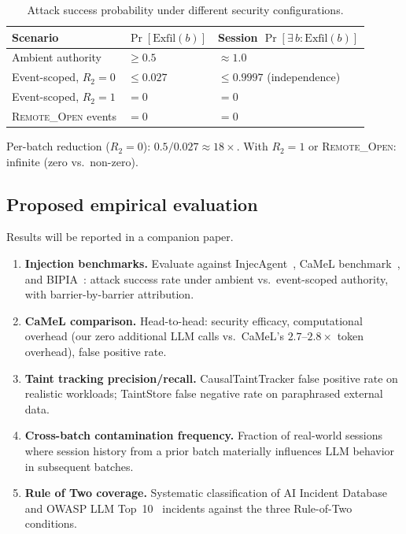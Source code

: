 \documentclass[pdflatex,sn-nature]{sn-jnl}%
\theoremstyle{thmstyleone}%
\theoremstyle{thmstyletwo}%
\theoremstyle{thmstylethree}%
\begin{document}
\begin{table}[ht]
\caption{Attack success probability under different security configurations.}\label{tab:scenario}
\begin{tabular}{@{}lll@{}}
\toprule
Scenario & $\Pr[\text{Exfil}(b)]$ & Session $\Pr[\exists\, b: \text{Exfil}(b)]$ \\
\midrule
Ambient authority & $\geq 0.5$ & $\approx 1.0$ \\[4pt]
Event-scoped, $R_2 = 0$ & $\leq 0.027$ & $\leq 0.9997$ (independence) \\[4pt]
Event-scoped, $R_2 = 1$ & $= 0$ & $= 0$ \\[4pt]
\textsc{Remote\_Open} events & $= 0$ & $= 0$ \\
\bottomrule
\end{tabular}
\end{table}

Per-batch reduction ($R_2=0$): $0.5 / 0.027 \approx 18\times$. With $R_2=1$ or \textsc{Remote\_Open}: infinite (zero vs.\ non-zero).

\subsection{Proposed empirical evaluation}\label{subsec:eval}

Results will be reported in a companion paper.

\begin{enumerate}
  \item \textbf{Injection benchmarks.} Evaluate against InjecAgent~\cite{zhan2024injecagent}, CaMeL benchmark~\cite{debenedetti2025camel}, and BIPIA~\cite{yi2023benchmarking}: attack success rate under ambient vs.\ event-scoped authority, with barrier-by-barrier attribution.
  \item \textbf{CaMeL comparison.} Head-to-head: security efficacy, computational overhead (our zero additional LLM calls vs.\ CaMeL's $2.7$--$2.8\times$ token overhead), false positive rate.
  \item \textbf{Taint tracking precision/recall.} CausalTaintTracker false positive rate on realistic workloads; TaintStore false negative rate on paraphrased external data.
  \item \textbf{Cross-batch contamination frequency.} Fraction of real-world sessions where session history from a prior batch materially influences LLM behavior in subsequent batches.
  \item \textbf{Rule of Two coverage.} Systematic classification of AI Incident Database~\cite{aiid2026} and OWASP LLM Top~10~\cite{owasp2025llmtop10} incidents against the three Rule-of-Two conditions.
\end{enumerate}
\end{document}

